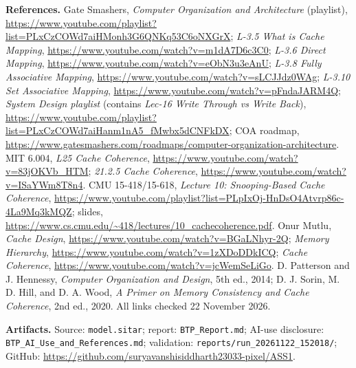 \documentclass[11pt,a4paper]{article}
\newcommand{\code}[1]{\texttt{\small #1}}
\begin{document}
\begin{sloppypar}
\textbf{References.} Gate Smashers, \emph{Computer Organization and Architecture}
(playlist), \url{https://www.youtube.com/playlist?list=PLxCzCOWd7aiHMonh3G6QNKq53C6oNXGrX};
\emph{L-3.5 What is Cache Mapping}, \url{https://www.youtube.com/watch?v=m1dA7D6c3C0};
\emph{L-3.6 Direct Mapping}, \url{https://www.youtube.com/watch?v=eObN3u3eAnU};
\emph{L-3.8 Fully Associative Mapping}, \url{https://www.youtube.com/watch?v=sLCJJdz0WAg};
\emph{L-3.10 Set Associative Mapping}, \url{https://www.youtube.com/watch?v=pFndaJARM4Q};
\emph{System Design playlist} (contains \emph{Lec-16 Write Through vs Write Back}),
\url{https://www.youtube.com/playlist?list=PLxCzCOWd7aiHanm1nA5_fMwbx5dCNFkDX};
COA roadmap, \url{https://www.gatesmashers.com/roadmaps/computer-organization-architecture}.
MIT 6.004, \emph{L25 Cache Coherence}, \url{https://www.youtube.com/watch?v=83jOKVb_HTM};
\emph{21.2.5 Cache Coherence}, \url{https://www.youtube.com/watch?v=ISaYWm8T8n4}.
CMU 15-418/15-618, \emph{Lecture 10: Snooping-Based Cache Coherence},
\url{https://www.youtube.com/playlist?list=PLpIxOj-HnDsO4Atvrp86c-4La9Mq3kMQZ};
slides, \url{https://www.cs.cmu.edu/~418/lectures/10_cachecoherence.pdf}.
Onur Mutlu, \emph{Cache Design}, \url{https://www.youtube.com/watch?v=BGaLNhyr-2Q};
\emph{Memory Hierarchy}, \url{https://www.youtube.com/watch?v=1zXDoDDkICQ};
\emph{Cache Coherence}, \url{https://www.youtube.com/watch?v=jcWemSeLiGo}.
D. Patterson and J. Hennessy, \emph{Computer Organization and Design}, 5th ed., 2014;
D. J. Sorin, M. D. Hill, and D. A. Wood, \emph{A Primer on Memory Consistency and Cache
Coherence}, 2nd ed., 2020. All links checked 22 November 2026.

\textbf{Artifacts.} Source: \code{model.sitar}; report: \code{BTP\_Report.md}; AI-use
disclosure: \code{BTP\_AI\_Use\_and\_References.md}; validation:
\code{reports/run\_20261122\_152018/}; GitHub:
\url{https://github.com/suryavanshisiddharth23033-pixel/ASS1}.
\end{sloppypar}
\end{document}
